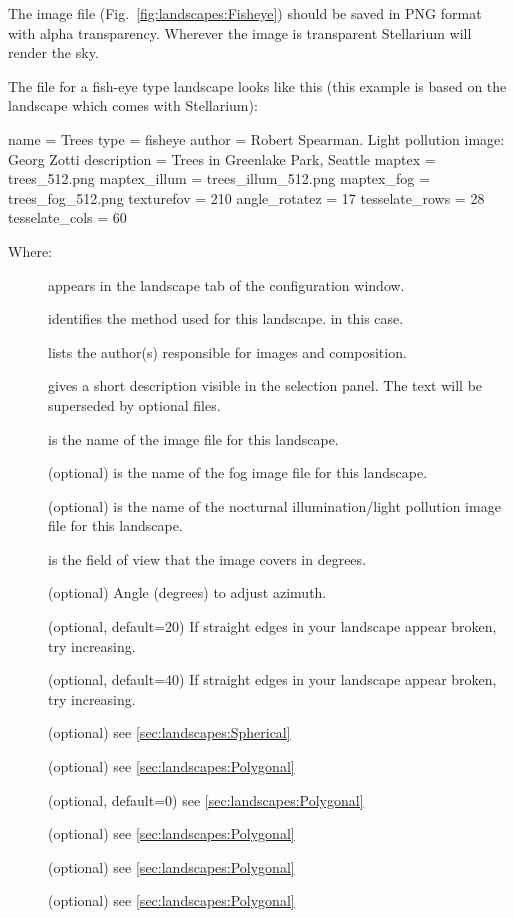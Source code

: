 The image file (Fig.~\ref{fig:landscapes:Fisheye}) should be saved in
PNG format with alpha transparency. Wherever the image is transparent
Stellarium will render the sky.

The  file for a fish-eye type landscape looks like
this (this example is based on the  landscape which
comes with Stellarium):

\begin{configfile}
[landscape]
name = Trees
type = fisheye
author = Robert Spearman. Light pollution image: Georg Zotti
description = Trees in Greenlake Park, Seattle
maptex = trees_512.png
maptex_illum = trees_illum_512.png
maptex_fog = trees_fog_512.png
texturefov = 210
angle_rotatez = 17
tesselate_rows = 28
tesselate_cols = 60
\end{configfile}
Where:
\begin{description}
\item[] appears in the landscape tab of the configuration window.
\item[] identifies the method used for this landscape.  in this case.
\item[] lists the author(s) responsible for images and composition.
\item[] gives a short description visible in the
  selection panel. The text will be superseded by optional
   files.
\item[] is the name of the image file for this landscape.
\item[] (optional) is the name of the fog image file for this landscape.
\item[] (optional) is the name of the nocturnal
  illumination/light pollution image file for this landscape.
\item[] is the field of view that the image covers in degrees.
\item[] (optional) Angle (degrees) to adjust azimuth.
\item[] (optional, default=20) If straight edges
  in your landscape appear broken, try increasing.
\item[] (optional, default=40) If straight edges
  in your landscape appear broken, try increasing.
\item[] (optional) see \ref{sec:landscapes:Spherical}
\item[] (optional) see \ref{sec:landscapes:Polygonal}
\item[] (optional, default=0) see \ref{sec:landscapes:Polygonal}
\item[] (optional) see \ref{sec:landscapes:Polygonal}
\item[] (optional)  see \ref{sec:landscapes:Polygonal}
\item[] (optional) see \ref{sec:landscapes:Polygonal}
\end{description}


